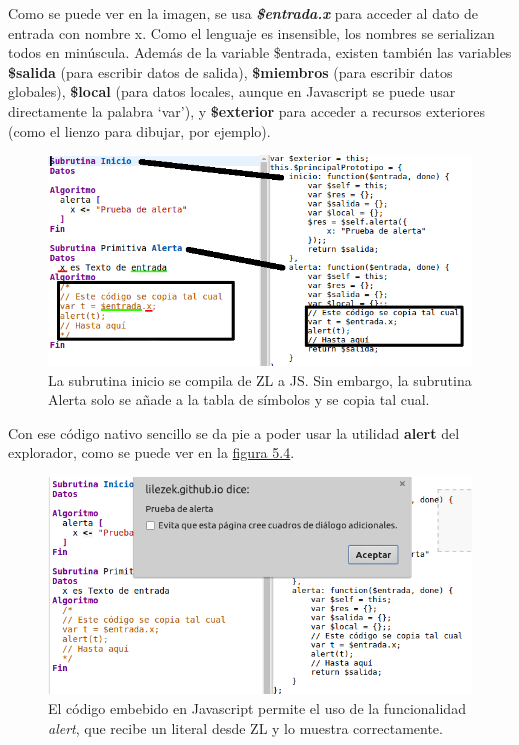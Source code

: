 \documentclass{report}
\begin{document}
	\vspace{10px}
	
	Como se puede ver en la imagen, se usa \textbf{\textit{\$entrada.x}} para acceder al dato de entrada con nombre x. Como el lenguaje es insensible, los nombres se serializan todos en minúscula. Además de la variable \$entrada, existen también las variables \textbf{\$salida} (para escribir datos de salida), \textbf{\$miembros} (para escribir datos globales), \textbf{\$local} (para datos locales, aunque en Javascript se puede usar directamente la palabra `var'), y \textbf{\$exterior} para acceder a recursos exteriores (como el lienzo para dibujar, por ejemplo). 
	
\begin{figure}
\centering
\includegraphics[width=1\linewidth]{zlyjs}
\caption[Ejemplo de código generado y código nativo.]{La subrutina inicio se compila de ZL a JS. Sin embargo, la subrutina Alerta solo se añade a la tabla de símbolos y se copia tal cual.}
\label{fig:zlyjs}
\end{figure}
	
	Con ese código nativo sencillo se da pie a poder usar la utilidad \textbf{alert} del explorador, como se puede ver en la \hyperref[fig:alert]{figura 5.4}.
	
\begin{figure}
\centering
\includegraphics[width=1\linewidth]{alert}
\caption[Código nativo que muestra una alerta.]{El código embebido en Javascript permite el uso de la funcionalidad \textit{alert}, que recibe un literal desde ZL y lo muestra correctamente.}
\label{fig:alert}
\end{figure}
\end{document}
